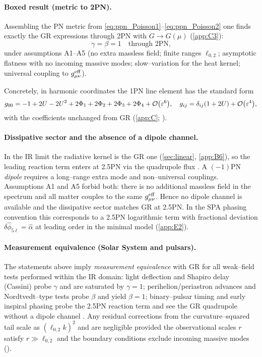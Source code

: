 \documentclass{iopjournal}
\begin{document}
\paragraph{Boxed result (metric to 2PN).}
Assembling the PN metric from \eqref{eq:ppn_Poisson1}–\eqref{eq:ppn_Poisson2} one finds exactly the GR expressions through 2PN with $G\to G(\mu)$ (\cref{app:C3}):
\[
\boxed{\gamma=\beta=1\quad\text{through 2PN,}}
\]
under assumptions A1–A5 (no extra massless field; finite ranges $\ell_{0,2}$; asymptotic flatness with no incoming massive modes; slow–variation for the heat kernel; universal coupling to $g^{\rm eff}_{\mu\nu}$).

Concretely, in harmonic coordinates the 1PN line element has the standard form
\[
g_{00}=-1+2U-2U^2+2\Phi_1+2\Phi_2+2\Phi_3+2\Phi_4+\order{\varepsilon^{6}},\quad
g_{ij}=\delta_{ij}(1+2U)+\order{\varepsilon^{4}},
\]
with the coefficients unchanged from GR (\cref{app:C}; \cite{PoissonWill2014,Blanchet2014LRR}).

\paragraph{Dissipative sector and the absence of a dipole channel.}
In the IR limit the radiative kernel is the GR one (\cref{sec:linear}, \cref{app:B6}), so the leading reaction term enters at 2.5PN via the quadrupole flux \cite{Blanchet2014LRR}. A $(-1)$PN \emph{dipole} requires a long–range extra mode and non–universal couplings. Assumptions A1 and A5 forbid both: there is no additional massless field in the spectrum and all matter couples to the same $g^{\rm eff}_{\mu\nu}$. Hence no dipole channel is available and the dissipative sector matches GR at 2.5PN. In the SPA phasing convention this corresponds to a 2.5PN logarithmic term with fractional deviation $\delta\hat\phi_{5\ell}=\widehat\alpha$ at leading order in the minimal model (\cref{app:E2}).

\paragraph{Measurement equivalence (Solar System and pulsars).}
The statements above imply \emph{measurement equivalence} with GR for all weak–field tests performed within the IR domain: light deflection and Shapiro delay (Cassini) probe $\gamma$ and are saturated by $\gamma=1$; perihelion/periastron advances and Nordtvedt–type tests probe $\beta$ and yield $\beta=1$; binary–pulsar timing and early inspiral phasing probe the 2.5PN reaction term and see the GR quadrupole without a dipole channel \cite{Will2014LRR,PoissonWill2014,Blanchet2014LRR,BertottiIessTortora2003}. Any residual corrections from the curvature–squared tail scale as $(\ell_{0,2}k)^2$ and are negligible provided the observational scales $r$ satisfy $r\gg \ell_{0,2}$ and the boundary conditions exclude incoming massive modes ().
\end{document}
